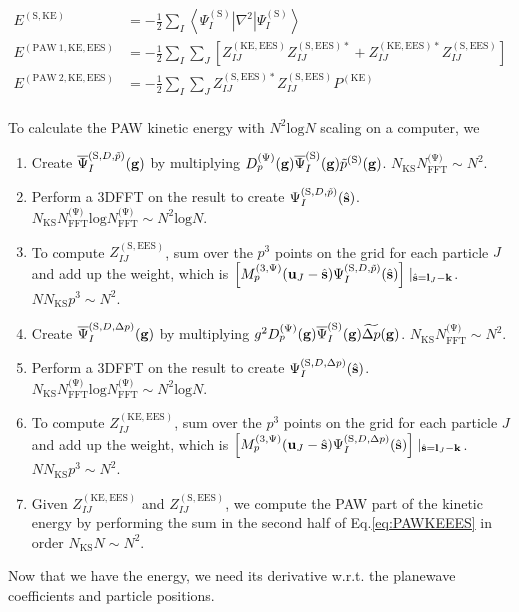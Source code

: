 \documentclass[paper=a4, fontsize=11pt]{article} %
\numberwithin{equation}{section} %
\numberwithin{figure}{section} %
\numberwithin{table}{section} %
\newcommand{\ol}{\overline}
\newcommand{\bu}{{\bf{u}}}
\newcommand{\bl}{{\bf{l}}}
\newcommand{\bk}{{\bf{k}}}
\newcommand{\bs}{{\bf{s}}}
\newcommand{\bg}{{\bf{g}}}
\newcommand{\hs}{{\hat{\bf{s}}}}
\newcommand{\rS}{{\mathrm{S}}}
\newcommand{\rKE}{{\mathrm{KE}}}
\newcommand{\rEES}{{\mathrm{EES}}}
\newcommand{\rP}{{\mathrm{PAW}}}
\newcommand{\rl}{{\mathrm{log}}}
\newcommand{\psigs}{{\overline \Psi_I^{(\rS)}(\bg)}}
\newcommand{\NKS}{{N_{\mathrm{KS}}}}
\newcommand{\NFFTp}{{N^{\mathrm{(\Psi})}_{\mathrm{FFT}}}}
\newcommand{\Dpg}{{D^{(\Psi)}_p(\bg)}}
\newcommand{\Mp}{{M_p^{(3,\Psi)}}}
\begin{document}
\begin{equation}
\begin{split}
E^{(\rS,\rKE)}
& = -\frac{1}{2}\sum_I \left<\Psi_I^{(\rS)}|\nabla^2|\Psi_I^{(\rS)}\right> \\
E^{(\rP\ 1,\rKE,\rEES)}
&= -\frac{1}{2}\sum_I \sum_J \left[Z_{IJ}^{(\rKE,\rEES)}Z_{IJ}^{(\rS,\rEES)*} + Z_{IJ}^{(\rKE,\rEES)*}Z_{IJ}^{(\rS,\rEES)} \right]\\
E^{(\rP\ 2,\rKE,\rEES)}
&= -\frac{1}{2}\sum_I \sum_J Z_{IJ}^{(\rS,\rEES)*}Z_{IJ}^{(\rS,\rEES)}P^{(\rKE)}\\
\end{split}
\end{equation}

To calculate the PAW kinetic energy with $N^2 \rl N$ scaling on a computer, we
\begin{enumerate}
\item Create $\ol \Psi_I^{(\rS,D,\tilde p)}(\bg)$ by multiplying $\Dpg \psigs \tilde p^{(\rS)}(\bg)$. $\NKS \NFFTp \sim N^2$.
\item Perform a 3DFFT on the result to create $\Psi_I^{(\rS,D,\tilde p)}(\hs)$. $\NKS \NFFTp \rl \NFFTp \sim N^2 \rl N$.
\item To compute $Z_{IJ}^{(\rS,\rEES)}$, sum over the $p^3$ points on the grid for each particle $J$ and add up the weight, which is $\left[\Mp(\bu_{J}-\hat \bs)\Psi_I^{(\rS,D,\tilde p)}(\hs)\right]\mid_{\hat \bs = \bl_J-\bk}$. $N \NKS p^3 \sim N^2$.
\item Create $\ol \Psi_I^{(\rS,D,\Delta p)}(\bg)$ by multiplying $g^2 \Dpg \psigs \widetilde{\Delta p}(\bg)$. $\NKS \NFFTp \sim N^2$.
\item Perform a 3DFFT on the result to create $\Psi_I^{(\rS,D,\Delta p)}(\hs)$. $\NKS \NFFTp \rl \NFFTp \sim N^2 \rl N$.
\item To compute $Z_{IJ}^{(\rKE,\rEES)}$, sum over the $p^3$ points on the grid for each particle $J$ and add up the weight, which is $\left[\Mp(\bu_{J}-\hat \bs)\Psi_I^{(\rS,D,\Delta p)}(\hs)\right]\mid_{\hat \bs = \bl_J-\bk}$. $N \NKS p^3 \sim N^2$.
\item Given $Z_{IJ}^{(\rKE,\rEES)}$ and $Z_{IJ}^{(\rS,\rEES)}$, we compute the PAW part of the kinetic energy by performing the sum in the second half of Eq.\eqref{eq:PAWKEEES} in order $\NKS N \sim N^2$.\\
\end{enumerate}

Now that we have the energy, we need its derivative w.r.t. the planewave coefficients and particle positions.
\end{document}
